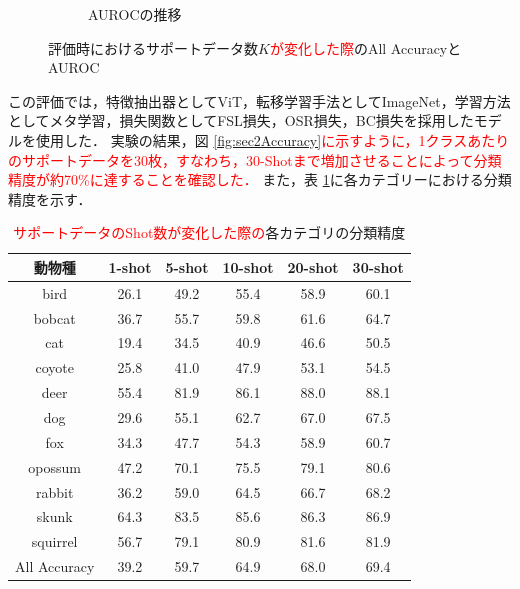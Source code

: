 \documentclass[a4paper,11pt,nomag]{jsreport}
\begin{document}
\begin{figure}[tbp]
\begin{subfigure}[b]{0.45\linewidth}
    \caption{AUROCの推移}
    \label{fig:sec2AUROC}
  \end{subfigure}
  \caption{評価時におけるサポートデータ数$K$\textcolor{red}{が変化した際}のAll AccuracyとAUROC}
  \label{fig:k-shot}
\end{figure}
% 
この評価では，特徴抽出器としてViT，転移学習手法としてImageNet，学習方法としてメタ学習，損失関数としてFSL損失，OSR損失，BC損失を採用したモデルを使用した．
実験の結果，図 \ref{fig:sec2Accuracy}\textcolor{red}{に示すように，1クラスあたりのサポートデータを30枚，すなわち，30-Shotまで増加させることによって分類精度が約70\%に達することを確認した．}
また，表 \ref{tbl:shot}に各カテゴリーにおける分類精度を示す．

\begin{table}[tbp]
  \centering
  \caption{\textcolor{red}{サポートデータのShot数が変化した際の}各カテゴリの分類精度}
  \label{tbl:shot}
  \begin{tabular}{c||c|c|c|c|c}
      \hline
      動物種        & 1-shot & 5-shot & 10-shot & 20-shot & 30-shot \\ \hline\hline
      bird         & 26.1   & 49.2   & 55.4    & 58.9    & 60.1    \\
      bobcat       & 36.7   & 55.7   & 59.8    & 61.6    & 64.7    \\
      cat          & 19.4   & 34.5   & 40.9    & 46.6    & 50.5    \\
      coyote       & 25.8   & 41.0   & 47.9    & 53.1    & 54.5    \\
      deer         & 55.4   & 81.9   & 86.1    & 88.0    & 88.1    \\
      dog          & 29.6   & 55.1   & 62.7    & 67.0    & 67.5    \\
      fox          & 34.3   & 47.7   & 54.3    & 58.9    & 60.7    \\
      opossum      & 47.2   & 70.1   & 75.5    & 79.1    & 80.6    \\
      rabbit       & 36.2   & 59.0   & 64.5    & 66.7    & 68.2    \\
      skunk        & 64.3   & 83.5   & 85.6    & 86.3    & 86.9    \\
      squirrel     & 56.7   & 79.1   & 80.9    & 81.6    & 81.9    \\ \hline\hline
      All Accuracy & 39.2   & 59.7   & 64.9    & 68.0    & 69.4    \\ \hline
  \end{tabular}
\end{table}
\end{document}
